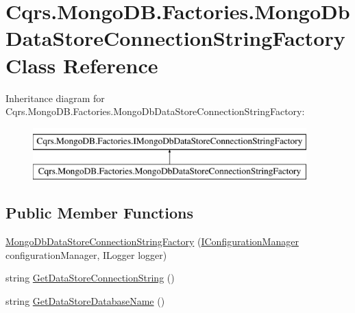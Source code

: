 \hypertarget{classCqrs_1_1MongoDB_1_1Factories_1_1MongoDbDataStoreConnectionStringFactory}{}\section{Cqrs.\+Mongo\+D\+B.\+Factories.\+Mongo\+Db\+Data\+Store\+Connection\+String\+Factory Class Reference}
\label{classCqrs_1_1MongoDB_1_1Factories_1_1MongoDbDataStoreConnectionStringFactory}
Inheritance diagram for Cqrs.\+Mongo\+D\+B.\+Factories.\+Mongo\+Db\+Data\+Store\+Connection\+String\+Factory\+:\begin{figure}[H]
\begin{center}
\leavevmode
\includegraphics[height=2.000000cm]{classCqrs_1_1MongoDB_1_1Factories_1_1MongoDbDataStoreConnectionStringFactory}
\end{center}
\end{figure}
\subsection*{Public Member Functions}
\begin{DoxyCompactItemize}
\item 
\hyperlink{classCqrs_1_1MongoDB_1_1Factories_1_1MongoDbDataStoreConnectionStringFactory_a9ccb753772ee1aa374ad39ba5b93700f_a9ccb753772ee1aa374ad39ba5b93700f}{Mongo\+Db\+Data\+Store\+Connection\+String\+Factory} (\hyperlink{interfaceCqrs_1_1Configuration_1_1IConfigurationManager}{I\+Configuration\+Manager} configuration\+Manager, I\+Logger logger)
\item 
string \hyperlink{classCqrs_1_1MongoDB_1_1Factories_1_1MongoDbDataStoreConnectionStringFactory_a76986fcc9521c87bfbb6e417ef13cd53_a76986fcc9521c87bfbb6e417ef13cd53}{Get\+Data\+Store\+Connection\+String} ()
\item 
string \hyperlink{classCqrs_1_1MongoDB_1_1Factories_1_1MongoDbDataStoreConnectionStringFactory_ab8729212ac8fe8350dead56fc89a5fd2_ab8729212ac8fe8350dead56fc89a5fd2}{Get\+Data\+Store\+Database\+Name} ()
\end{DoxyCompactItemize}
